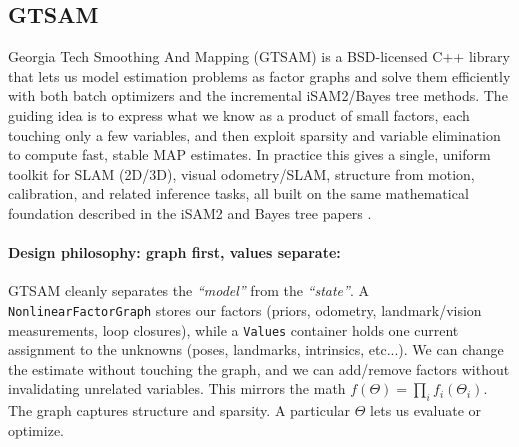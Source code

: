 \subsection{GTSAM}
Georgia Tech Smoothing And Mapping (\gls{GTSAM}) is a BSD-licensed C++ library that lets us model estimation problems as factor graphs and solve them efficiently with both batch optimizers and the incremental \gls{iSAM}2/Bayes tree methods. The guiding idea is to express what we know as a product of small factors, each touching only a few variables, and then exploit sparsity and variable elimination to compute fast, stable \gls{MAP} estimates. In practice this gives a single, uniform toolkit for \gls{SLAM} (2D/3D), visual odometry/\gls{SLAM}, structure from motion, calibration, and related inference tasks, all built on the same mathematical foundation described in the \gls{iSAM}2 and Bayes tree papers \cite{GTSAM_handbook,iSAM2_paper,Bayes_tree_for_SLAM_paper}.

\paragraph{Design philosophy: graph first, values separate:}
\gls{GTSAM} cleanly separates the \textit{``model''} from the \textit{``state''}. A \texttt{NonlinearFactorGraph} stores our factors (priors, odometry, landmark/vision measurements, loop closures), while a \texttt{Values} container holds one current assignment to the unknowns (poses, landmarks, intrinsics, etc...). We can change the estimate without touching the graph, and we can add/remove factors without invalidating unrelated variables. This mirrors the math $f(\Theta)=\prod_i f_i(\Theta_i)$. The graph captures structure and sparsity. A particular $\Theta$ lets us evaluate or optimize. \cite{GTSAM_handbook}

